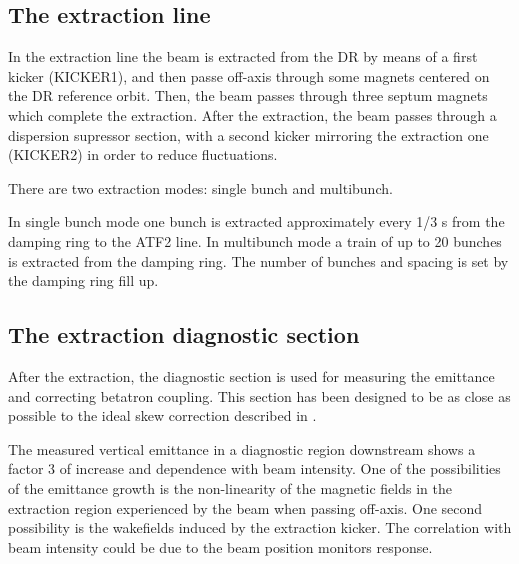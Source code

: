 {{\subsection{The extraction line}
In the extraction line the beam is extracted from the DR by means of a first kicker (KICKER1), and then passe off-axis through some magnets centered on the DR reference orbit. Then, the beam passes through three septum magnets which complete the extraction. After the extraction, the beam passes through a dispersion supressor section, with a second kicker mirroring the extraction one (KICKER2) in order to reduce fluctuations.\par
There are two extraction modes: single bunch and multibunch.\par
In single bunch mode one bunch is extracted approximately every 1/3 s from the damping ring to the ATF2 line. In multibunch mode a train of up to 20 bunches is extracted from the damping ring. The number of bunches and spacing is set by the damping ring fill up.\par
\subsection{The extraction diagnostic section}
After the extraction, the diagnostic section is used for measuring the emittance and correcting betatron coupling. This section has been designed to be as close as possible to the ideal skew correction described in \cite{Woodley:453645}.\par
The measured vertical emittance in a diagnostic region downstream shows a factor 3 of increase and dependence with beam
intensity. One of the possibilities of the emittance growth is the non-linearity of the magnetic fields in the extraction region experienced by the beam when passing off-axis. One second possibility is the wakefields induced by the extraction kicker. The correlation with beam intensity could be due to the beam position monitors response.\par
}}
